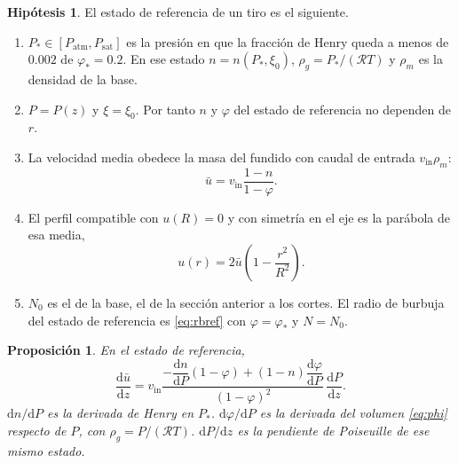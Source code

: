 \documentclass[11pt,a4paper]{article}
\newcommand{\sat}{\mathrm{sat}}
\newcommand{\Rv}{\mathcal{R}}
\theoremstyle{plain}
\newtheorem{proposicion}{Proposición}
\theoremstyle{definition}
\newtheorem{hipotesis}{Hipótesis}
\theoremstyle{remark}
\begin{document}
\begin{hipotesis}
\label{hip:ref}
El estado de referencia de un tiro es el siguiente.
\begin{enumerate}
\item \(P_\ast\in[P_{\mathrm{atm}},P_{\sat}]\) es la presión en que la
      fracción de Henry queda a menos de \(0.002\) de \(\varphi_\ast=0.2\).
      En ese estado \(n=n(P_\ast,\xi_0)\), \(\rho_g=P_\ast/(\Rv T)\) y
      \(\rho_m\) es la densidad de la base.
\item \(P=P(z)\) y \(\xi=\xi_0\). Por tanto \(n\) y \(\varphi\) del estado
      de referencia no dependen de \(r\).
\item La velocidad media obedece la masa del fundido con caudal de entrada
      \(v_{\mathrm{in}}\rho_m\):
      \begin{equation}
      \bar u
      =
      v_{\mathrm{in}}\frac{1-n}{1-\varphi}.
      \label{eq:umed}
      \end{equation}
\item El perfil compatible con \(u(R)=0\) y con simetría en el eje es la
      parábola de esa media,
      \begin{equation}
      u(r)
      =
      2\bar u\left(1-\frac{r^2}{R^2}\right).
      \label{eq:upar}
      \end{equation}
\item \(N_0\) es el de la base, el de la sección anterior a los cortes.
      El radio de burbuja del estado de referencia es
      \eqref{eq:rbref} con \(\varphi=\varphi_\ast\) y \(N=N_0\).
\end{enumerate}
\end{hipotesis}

\begin{proposicion}
\label{prop:dudz}
En el estado de referencia,
\begin{equation}
\frac{\mathrm{d}\bar u}{\mathrm{d}z}
=
v_{\mathrm{in}}
\frac{
-\dfrac{\mathrm{d}n}{\mathrm{d}P}(1-\varphi)
+(1-n)\dfrac{\mathrm{d}\varphi}{\mathrm{d}P}
}{(1-\varphi)^2}
\,
\frac{\mathrm{d}P}{\mathrm{d}z}.
\label{eq:dudz}
\end{equation}
\(\mathrm{d}n/\mathrm{d}P\) es la derivada de Henry en \(P_\ast\).
\(\mathrm{d}\varphi/\mathrm{d}P\) es la derivada del volumen
\eqref{eq:phi} respecto de \(P\), con \(\rho_g=P/(\Rv T)\).
\(\mathrm{d}P/\mathrm{d}z\) es la pendiente de Poiseuille de ese mismo
estado.
\end{proposicion}
\end{document}
